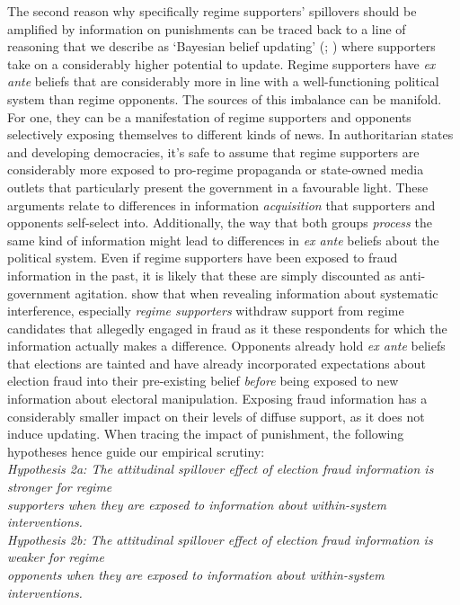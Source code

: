 \documentclass[11pt, ngerman,english,a4]{article}
\begin{document}
The second reason why specifically regime supporters' spillovers should be amplified by information on punishments can be traced back to a line of reasoning that we describe as `Bayesian belief updating' (\citealt{Bullock2009}; \citealt{Hill2017}) where supporters take on a considerably higher potential to update. Regime supporters have \textit{ex ante} beliefs that are considerably more in line with a well-functioning political system than regime opponents. The sources of this imbalance can be manifold. For one, they can be a manifestation of regime supporters and opponents selectively exposing themselves to different kinds of news. In authoritarian states and developing democracies, it's safe to assume that regime supporters are considerably more exposed to pro-regime propaganda or state-owned media outlets that particularly present the government in a favourable light. These arguments relate to differences in information \textit{acquisition} that supporters and opponents self-select into. Additionally, the way that both groups \textit{process} the same kind of information might lead to differences in \textit{ex ante} beliefs about the political system. Even if regime supporters have been exposed to fraud information in the past, it is likely that these are simply discounted as anti-government agitation. \citet{Reuter2019} show that when revealing information about systematic interference, especially \textit{regime supporters} withdraw support from regime candidates that allegedly engaged in fraud as it these respondents for which the information actually makes a difference. Opponents already hold \textit{ex ante} beliefs that elections are tainted and have already incorporated expectations about election fraud into their pre-existing belief \textit{before} being exposed to new information about electoral manipulation. Exposing fraud information has a considerably smaller impact on their levels of diffuse support, as it does not induce updating. When tracing the impact of punishment, the following hypotheses hence guide our empirical scrutiny: \\

\indent \textit{Hypothesis 2a: The attitudinal spillover effect of election fraud information is stronger for regime \\ \indent supporters when they are exposed to information about within-system interventions.} \\

\indent \textit{Hypothesis 2b: The attitudinal spillover effect of election fraud information is weaker for regime \\ \indent opponents when they are exposed to information about within-system interventions.}
\end{document}
